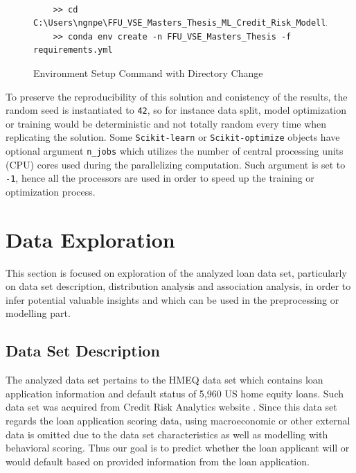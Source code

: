 \begin{figure}[H]
    \centering\caption{Environment Setup Command with Directory Change}
    \label{fig:envsetupcd}
\centering\
{\footnotesize
\begin{verbatim}
    >> cd C:\Users\ngnpe\FFU_VSE_Masters_Thesis_ML_Credit_Risk_Modelling
    >> conda env create -n FFU_VSE_Masters_Thesis -f requirements.yml   
\end{verbatim}
}

\vspace{0em}
\end{figure}


To preserve the reproducibility of this solution and conistency of the results, the random seed is instantiated to \texttt{42}, so for instance data split, model optimization or training would be deterministic and not totally random every time when replicating the solution.
Some \lstinline{Scikit-learn} or \lstinline{Scikit-optimize} objects have optional argument \texttt{n\_jobs} which utilizes the number of central processing units (CPU) cores used during the parallelizing computation. Such argument is set to \texttt{-1}, hence all the processors are used in order to  speed up the training or optimization process.

\newpage
\section{Data Exploration}
\label{sec:dataexploration}
This section is focused on exploration of the analyzed loan data set, particularly on data set description, distribution analysis and association analysis, in order to infer potential valuable insights and which can be used in the preprocessing or modelling part.

\subsection{Data Set Description}
\label{subsec:datadescript}
The analyzed data set pertains to the HMEQ data set which contains loan application information and default status of 5,960 US home equity loans. Such data set was acquired from Credit Risk Analytics website \citep{baesens2016credit}. Since this data set regards the loan application scoring data, using macroeconomic or other external data is omitted due to the data set characteristics as well as modelling with behavioral scoring.
Thus our goal is to predict whether the loan applicant will or would default based on provided information from the loan application.

